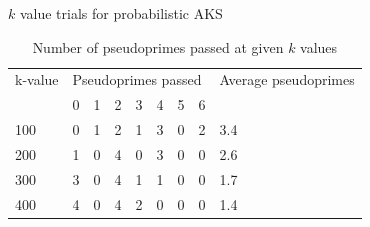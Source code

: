 \documentclass[pdf,aspectratio=169]{beamer}
\begin{document}
\begin{frame}{$k$ value trials for probabilistic AKS}
    \begin{table}
        \caption{Number of pseudoprimes passed at given $k$ values\label{table:paks_pprimes_v_bases}}
        \begin{tabular}{l|lllllll|l}
            \toprule
            k-value & \multicolumn{7}{l|}{Pseudoprimes passed} & Average pseudoprimes  \\
            & 0 & 1 & 2 & 3 & 4 & 5 & 6                &                       \\
            \hline
            100     & 0 & 1 & 2 & 1 & 3 & 0 & 2                & 3.4                   \\
            200     & 1 & 0 & 4 & 0 & 3 & 0 & 0                & 2.6                   \\
            300     & 3 & 0 & 4 & 1 & 1 & 0 & 0                & 1.7                   \\
            400     & 4 & 0 & 4 & 2 & 0 & 0 & 0                & 1.4                   \\
            \bottomrule
        \end{tabular}
    \end{table}
    \begin{outline}
    \end{outline}
\end{frame}
\end{document}
